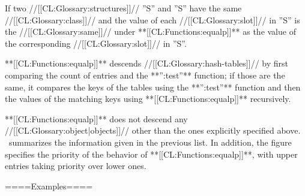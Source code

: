 
If two //[[CL:Glossary:structures]]// ''S'' and ''S'' have the same //[[CL:Glossary:class]]// and the value of each //[[CL:Glossary:slot]]// in ''S'' is the //[[CL:Glossary:same]]// under **[[CL:Functions:equalp]]** as the value of the corresponding //[[CL:Glossary:slot]]// in ''S''.


**[[CL:Functions:equalp]]** descends //[[CL:Glossary:hash-tables]]// by first comparing the count of entries and the **'':test''** function; if those are the same, it compares the keys of the tables using the **'':test''** function and then the values of the matching keys using **[[CL:Functions:equalp]]** recursively.

\endlist

**[[CL:Functions:equalp]]** does not descend any //[[CL:Glossary:object|objects]]// other than the ones explicitly specified above. \Thenextfigure\ summarizes the information given in the previous list. In addition, the figure specifies the priority of the behavior of **[[CL:Functions:equalp]]**, with upper entries taking priority over lower ones.


====Examples====

